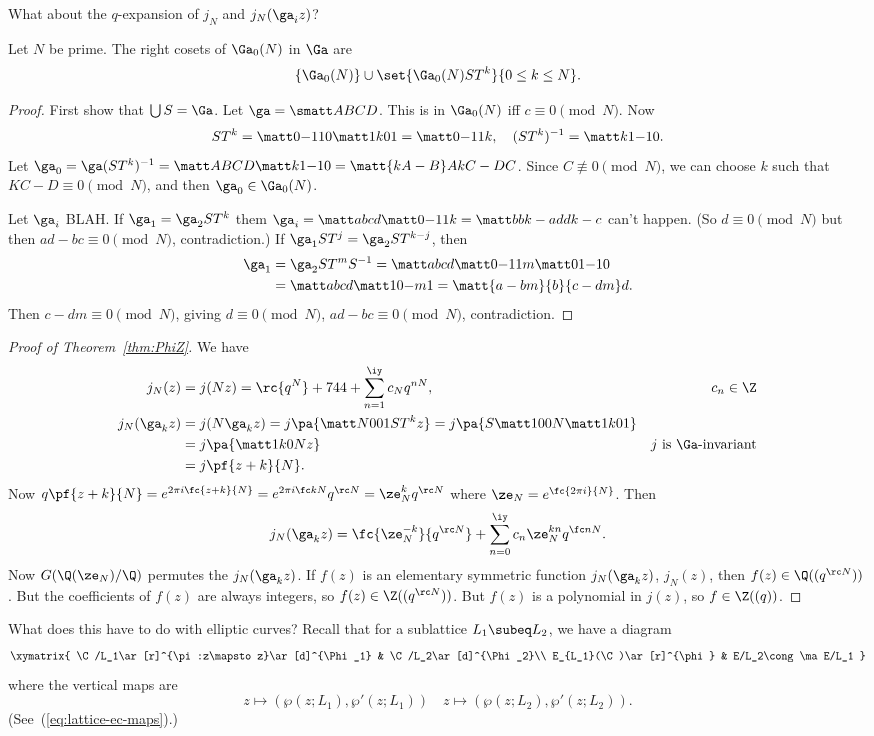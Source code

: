 What about the $q$-expansion of $j_N$ and $j_N(\ga_iz)$?
\begin{lem}
Let $N$ be prime. The right cosets of $\Ga_0(N)$ in $\Ga$ are
\[
\{\Ga_0(N)\}\cup \set{\Ga_0(N)ST^k}{0\le k\le N}.
\]
\end{lem}
\begin{proof}
First show that $\bigcup S=\Ga$. Let $\ga=\smatt ABCD$. This is in $\Ga_0(N)$ iff $c\equiv 0\pmod N$. Now
\[
ST^k=\matt 0{-1}10\matt 1k01=\matt 0{-1}1k,\quad (ST^k)^{-1} =\matt k1{-1}0.
\]
Let $\ga_0=\ga(ST^k)^{-1}=\matt ABCD \matt k1{-1}0=\matt{kA-B}A{kC-D}C$. Since $C\nequiv 0\pmod N$, we can choose $k$ such that $KC-D\equiv 0\pmod N$, and then $\ga_0\in \Ga_0(N)$.

Let $\ga_i$ BLAH.
If $\ga_1=\ga_2ST^k$ them $\ga_i=\matt abcd\matt0{-1}1k=\matt b{bk-a}d{dk-c}$ can't happen.  (So $d\equiv 0\pmod N$ but then $ad-bc\equiv 0\pmod N$, contradiction.) If $\ga_1ST^j=\ga_2ST^{k-j}$, then \begin{align*}
\ga_1&=\ga_2ST^mS^{-1}=\matt abcd \matt 0{-1}1m\matt 01{-1}0\\
&=\matt abcd \matt 10{-m}1=\matt{a-bm}{b}{c-dm}d.
\end{align*}
Then $c-dm\equiv 0\pmod N$, giving $d\equiv 0\pmod N$, $ad-bc\equiv 0\pmod N$, contradiction. 
\end{proof}
\begin{proof}[Proof of Theorem~\ref{thm:PhiZ}]
We have
\begin{align*}
j_N(z)&=j(Nz)=\rc{q^N} +744+\sum_{n=1}^{\iy} c_Nq^{nN},&c_n\in \Z\\
j_N(\ga_kz)&=j(N\ga_k z)=j\pa{\matt N001 ST^k z}=j\pa{
S\matt 100N\matt 1k01
}\\
&=j\pa{\matt 1k0N z}&\text{$j$ is $\Ga$-invariant}\\
&=j\pf{z+k}{N}.
\end{align*}
Now $q\pf{z+k}{N}=e^{2\pi i \fc{z+k}{N}} =e^{2\pi i\fc kN} q^{\rc N}=\ze_N^kq^{\rc N}$ where $\ze_N=e^{\fc{2\pi i}{N}}$. Then
\[
j_N(\ga_kz)=\fc{\ze_N^{-k}}{q^{\rc N}}+\sum_{n=0}^{\iy} c_n\ze_N^{kn} q^{\fc nN}.
\]
Now $G(\Q(\ze_N)/\Q)$ permutes the $j_N(\ga_kz)$. If $f(z)$ is an elementary symmetric function $j_N(\ga_kz)$, $j_N(z)$, then $f(z)\in \Q((q^{\rc N}))$. But the coefficients of $f(z)$ are always integers, so $f(z)\in \Z((q^{\rc N}))$. But $f(z)$ is a polynomial in $j(z)$, so $f\in \Z((q))$. 
\end{proof}
What does this have to do with elliptic curves?
Recall that for a sublattice $L_1\subeq L_2$, we have a diagram
\[
\xymatrix{
\C/L_1\ar[r]^{\pi:z\mapsto z}\ar[d]^{\Phi_1} & \C/L_2\ar[d]^{\Phi_2}\\
E_{L_1}(\C)\ar[r]^{\phi} & E/L_2\cong \ma E/L_1
}
\]
where the vertical maps are 
\[
z\mapsto (\wp(z;L_1),\wp'(z;L_1))\quad z\mapsto (\wp(z;L_2),\wp'(z;L_2)).
\]
(See~(\ref{eq:lattice-ec-maps}).)

